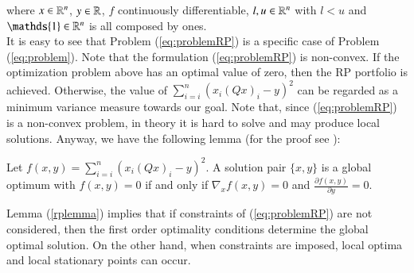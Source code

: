 where $x \in \mathbb{R}^n$, $y \in \mathbb{R}$, $f$ continuously differentiable, $l, u \in \mathbb{R}^n$ with $l < u$ and $\mathds{1} \in \R^n$ is all composed by ones. \\
It is easy to see that Problem (\ref{eq:problemRP}) is a specific case of Problem (\ref{eq:problem}). Note that the formulation (\ref{eq:problemRP}) is non-convex.  If the optimization problem above has an optimal value of zero, then the RP portfolio is achieved. Otherwise, the value of $\sum_{i=i}^n \left( x_i(Q x)_i - y\right)^2$  can be regarded as a minimum variance measure towards our goal. Note that, since (\ref{eq:problemRP}) is a non-convex problem, in theory it is hard to solve and may produce local solutions. Anyway, we have the following lemma (for the proof see \cite{tutuncu}):
\begin{lemma}\label{rplemma}
Let $f(x,y) = \sum_{i=i}^n \left( x_i(Q x)_i - y \right)^2$. A solution pair $\{x,y\}$ is a global optimum with $f(x,y)=0$ if and only if $\nabla_xf(x,y) = 0$ and $\frac{\partial f(x,y)}{\partial y} = 0$.
\end{lemma}
Lemma (\ref{rplemma}) implies that if constraints of (\ref{eq:problemRP}) are not considered, then the first order optimality conditions determine the global optimal solution. On the other hand, when constraints are imposed, local optima and local stationary points can occur.